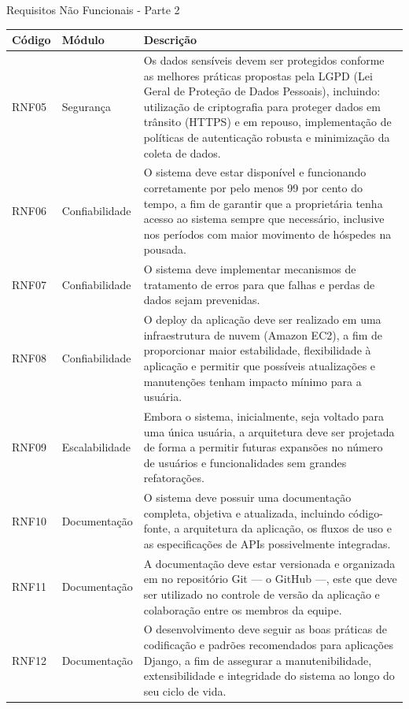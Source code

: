 \documentclass[
	12pt,				%
	openany,			%
	oneside,			%
	a4paper,			%
	english,			%
	french,				%
	spanish,			%
	brazil				%
	]{abntex2}
\begin{document}
\begin{quadro}[H]
	\caption{\label{quadro_rnf2}Requisitos Não Funcionais - Parte 2}
	\begin{tabular}{|>{\centering\arraybackslash}m{2cm}|>{\centering\arraybackslash}m{4cm}|>{\raggedright\arraybackslash}m{8cm}|}
		\hline
		\textbf{Código} & \textbf{Módulo} & \textbf{Descrição}
		 \\ \hline
		RNF05 & Segurança & Os dados sensíveis devem ser protegidos conforme as melhores práticas propostas pela LGPD (Lei Geral de Proteção de Dados Pessoais), incluindo: utilização de criptografia para proteger dados em trânsito (HTTPS) e em repouso, implementação de políticas de autenticação robusta e minimização da coleta de dados. 
		\\ \hline
		RNF06 & Confiabilidade & O sistema deve estar disponível e funcionando corretamente por pelo menos 99 por cento do tempo, a fim de garantir que a proprietária tenha acesso ao sistema sempre que necessário, inclusive nos períodos com maior movimento de hóspedes na pousada.
		 \\ \hline
		RNF07 & Confiabilidade & O sistema deve implementar mecanismos de tratamento de erros para que falhas e perdas de dados sejam prevenidas. 
		\\ \hline
		RNF08 & Confiabilidade & O deploy da aplicação deve ser realizado em uma infraestrutura de nuvem (Amazon EC2), a fim de proporcionar maior estabilidade, flexibilidade à aplicação e permitir que possíveis atualizações e manutenções tenham impacto mínimo para a usuária.
		 \\ \hline
		RNF09 & Escalabilidade & Embora o sistema, inicialmente, seja voltado para uma única usuária, a arquitetura deve ser projetada de forma a permitir futuras expansões no número de usuários e funcionalidades sem grandes refatorações. 
		\\ \hline
		RNF10 & Documentação & O sistema deve possuir uma documentação completa, objetiva e atualizada, incluindo código-fonte, a arquitetura da aplicação, os fluxos de uso e as especificações de APIs possivelmente integradas.
		\\ \hline
		RNF11 & Documentação & A documentação deve estar versionada e organizada em no repositório Git — o GitHub —, este que deve ser utilizado no controle de versão da aplicação e colaboração entre os membros da equipe.
		\\ \hline
		RNF12 & Documentação & O desenvolvimento deve seguir as boas práticas de codificação e padrões recomendados para aplicações Django, a fim de assegurar a manutenibilidade, extensibilidade e integridade do sistema ao longo do seu ciclo de vida. \\ \hline
	\end{tabular}
\end{quadro}
%
\end{document}

